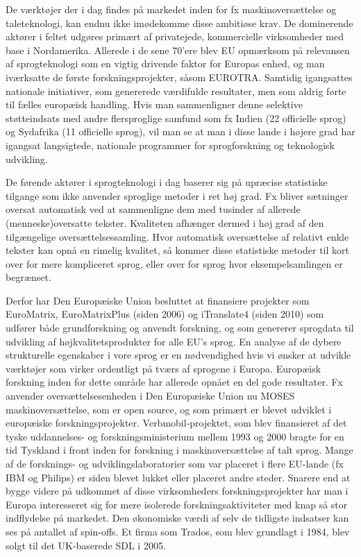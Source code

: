 \documentclass[]{../../metanetpaper}
\begin{document}
\begin{multicols}{2}
 De v\ae rkt\o jer der i dag findes \mbox{p\aa} markedet inden for fx maskinovers\ae ttelse og taleteknologi, kan endnu ikke im\o dekomme disse ambiti\o se krav. De dominerende akt\o rer i feltet udg\o res prim\ae rt af privatejede, kommercielle virksomheder med base i Nordamerika. Allerede i de sene 70'ere blev EU opm\ae rksom \mbox{p\aa} relevansen af sprogteknologi som en vigtig drivende faktor for Europas enhed, og man iv\ae rksatte de f\o rste forskningsprojekter, \mbox{s\aa}som EUROTRA. Samtidig igangsattes nationale initiativer, som genererede v\ae rdifulde resultater, men som aldrig f\o rte til f\ae lles europ\ae isk handling. 
Hvis man sammenligner denne selektive st\o tteindsats med andre flersproglige samfund som fx Indien (22 officielle sprog) og Sydafrika (11 officielle sprog), vil man se at man i disse lande i h\o jere grad har igangsat langsigtede, nationale programmer for sprogforskning og teknologisk udvikling.

De f\o rende akt\o rer i sprogteknologi i dag baserer sig \mbox{p\aa} upr\ae cise statistiske tilgange som ikke anvender sproglige metoder i ret h\o j grad. Fx bliver s\ae tninger oversat automatisk ved at sammenligne dem med tusinder af allerede (menneske)oversatte tekster. Kvaliteten afh\ae nger dermed i h\o j grad af den tilg\ae ngelige overs\ae ttelsessamling. Hvor automatisk overs\ae ttelse af relativt enkle tekster kan \mbox{opn\aa} en rimelig kvalitet, \mbox{s\aa} kommer disse statistiske metoder til kort over for mere kompliceret sprog, eller over for sprog hvor eksempelsamlingen er begr\ae nset.


Derfor har Den Europ\ae iske Union besluttet at finansiere projekter som EuroMatrix, EuroMatrixPlus (siden 2006) og iTranslate4 (siden 2010) som udf\o rer b\aa de grundforskning og anvendt forskning, og som genererer sprogdata til udvikling af h\o jkvalitetsprodukter for alle EU's sprog. En analyse af de dybere strukturelle egenskaber i vore sprog er en n\o dvendighed hvis vi \o nsker at udvikle v\ae rkt\o jer som virker ordentligt \mbox{p\aa} tv\ae rs af sprogene i Europa.
Europ\ae isk forskning inden for dette omr\aa de har allerede opn\aa et en del gode resultater. Fx anvender overs\ae ttelsesenheden i Den Europ\ae iske Union nu MOSES maskinovers\ae ttelse, som er open source, og som prim\ae rt er blevet udviklet i europ\ae iske forskningsprojekter. Verbmobil-projektet, som blev finansieret af det tyske uddannelses- og forskningsministerium mellem 1993 og 2000 bragte for en tid Tyskland i front inden for forskning i maskinovers\ae ttelse af talt sprog. Mange af de forsknings- og udviklingslaboratorier som var placeret i flere EU-lande (fx IBM og Philips) er siden blevet lukket eller placeret andre steder. Snarere end at bygge videre \mbox{p\aa} udkommet af disse virksomheders forskningsprojekter har man i Europa interesseret sig for mere isolerede forskningsaktiviteter med knap \mbox{s\aa} stor indflydelse \mbox{p\aa} markedet. Den \o konomiske v\ae rdi af selv de tidligste indsatser kan ses \mbox{p\aa} antallet af spin-offs. Et firma som Trados, som blev grundlagt i 1984, blev solgt til det UK-baserede SDL i 2005.


\end{multicols}
\end{document}
